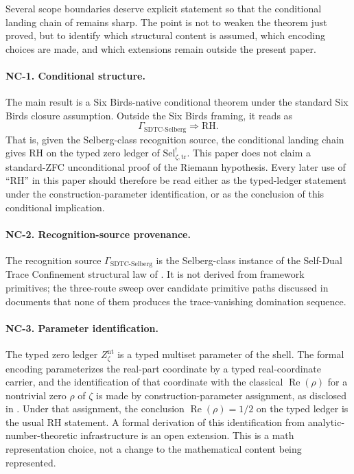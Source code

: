 \documentclass[11pt]{article}
\DeclareMathOperator{\Real}{Re}
\newcommand{\Znt}{Z_{\zeta}^{\mathrm{nt}}}
\newcommand{\Sel}{\mathrm{Sel}^{!}_{\zeta,\mathrm{tr}}}
\newcommand{\GamSDTCSelberg}{\Gamma_{\mathrm{SDTC\text{-}Selberg}}}
\theoremstyle{definition}
\begin{document}
Several scope boundaries deserve explicit statement so that the
conditional landing chain of  remains sharp.
The point is not to weaken the theorem just proved, but to identify
which structural content is assumed, which encoding choices are
made, and which extensions remain outside the present paper.

\paragraph{NC-1. Conditional structure.}
The main result is a Six Birds-native conditional theorem under
the standard Six Birds closure assumption.  Outside the Six Birds
framing, it reads as
\[
  \GamSDTCSelberg \Longrightarrow \mathrm{RH}.
\]
That is, given the Selberg-class recognition source, the conditional
landing chain gives RH on the typed zero ledger of \(\Sel\).  This
paper does not claim a standard-ZFC unconditional proof of the
Riemann hypothesis.  Every later use of ``RH'' in this paper should
therefore be read either as the typed-ledger statement under the
construction-parameter identification, or as the conclusion of this
conditional implication.

\paragraph{NC-2. Recognition-source provenance.}
The recognition source \(\GamSDTCSelberg\) is the Selberg-class
instance of the Self-Dual Trace Confinement structural law of
\citet{TsiokosSDTC2026}.  It is not derived from framework
primitives; the three-route sweep over candidate primitive paths
discussed in  documents that none of
them produces the trace-vanishing domination sequence.

\paragraph{NC-3. Parameter identification.}
The typed zero ledger \(\Znt\) is a typed multiset parameter of the
shell.  The formal encoding parameterizes the real-part coordinate by
a typed real-coordinate carrier, and the identification of that
coordinate with the classical \(\Real(\rho)\) for a nontrivial zero
\(\rho\) of \(\zeta\) is made by construction-parameter assignment,
as disclosed in .  Under that
assignment, the conclusion \(\Real(\rho)=1/2\) on the typed ledger is
the usual RH statement.  A formal derivation of this identification
from analytic-number-theoretic infrastructure is an open extension.
This is a math representation choice, not a change to the
mathematical content being represented.
\end{document}

